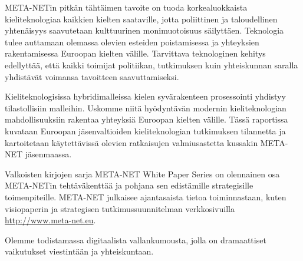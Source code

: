 \documentclass[]{../../metanetpaper}
\begin{document}
\begin{multicols}{2}

META-NETin pitkän tähtäimen tavoite on tuoda korkealuokkaista
kieliteknologiaa kaikkien kielten saataville, jotta poliittinen ja 
taloudellinen yhtenäisyys saavutetaan kulttuurinen monimuotoisuus
säilyttäen. Teknologia tulee auttamaan olemassa olevien esteiden
poistamisessa ja yhteyksien rakentamisessa Euroopan kielten
välille. Tarvittava teknologinen kehitys edellyttää, että kaikki
toimijat politiikan, tutkimuksen kuin yhteiskunnan saralla yhdistävät
voimansa tavoitteen saavuttamiseksi.

Kieliteknologisissa hybridimalleissa kielen syvärakenteen prosessointi
yhdistyy tilastollisiin malleihin. Uskomme niitä hyödyntävän modernin
kieliteknologian mahdollisuuksiin rakentaa yhteyksiä Euroopan kielten
välille. Tässä raportissa kuvataan Euroopan jäsenvaltioiden
kieliteknologian tutkimuksen tilannetta ja kartoitetaan käytettävissä
olevien ratkaisujen valmiusastetta kussakin META-NET jäsenmaassa.

Valkoisten kirjojen sarja META-NET White Paper Series on olennainen
osa META-NETin tehtäväkenttää ja pohjana sen edistämille strategisille
toimenpiteille. META-NET julkaisee ajantasaista tietoa toiminnastaan,
kuten visiopaperin \cite{Vision} ja strategisen tutkimussuunnitelman
verkkosivuilla \url{http://www.meta-net.eu}.

Olemme todistamassa digitaalista vallankumousta, jolla on dramaattiset
vaikutukset viestintään ja yhteiskuntaan.

\end{multicols}

\clearpage
\end{document}
